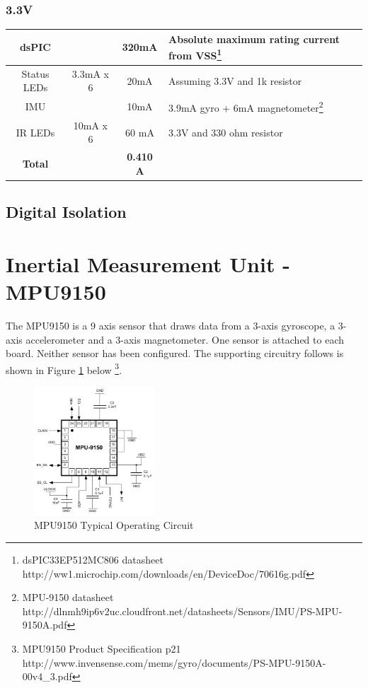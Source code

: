 \documentclass{article}
\begin{document}
\subsubsection*{3.3V}
\begin{longtable}{|c | c | c |  >{\centering\arraybackslash}p{} |} \hline
dsPIC && 320mA & Absolute maximum rating current from VSS\footnote{dsPIC33EP512MC806 datasheet http://ww1.microchip.com/downloads/en/DeviceDoc/70616g.pdf}\\ \hline
Status LEDs & 3.3mA x 6& 20mA & Assuming 3.3V and 1k resistor\\ \hline
IMU && 10mA & 3.9mA gyro + 6mA magnetometer\footnote{MPU-9150 datasheet http://dlnmh9ip6v2uc.cloudfront.net/datasheets/Sensors/IMU/PS-MPU-9150A.pdf} \\ \hline
IR LEDs &10mA x 6 & 60 mA & 3.3V  and 330 ohm resistor\\ \hline
\textbf{Total} && \textbf{0.410 A} &\\ \hline
\end{longtable}
\subsection{Digital Isolation}

\section{Inertial Measurement Unit - MPU9150}
The MPU9150 is a 9 axis sensor that draws data from a 3-axis gyroscope, a 3-axis accelerometer and a 3-axis magnetometer. One sensor is attached to each board. Neither sensor has been configured. The supporting circuitry follows is shown in Figure \ref{mpu9150} below \footnote{MPU9150 
Product Specification p21 http://www.invensense.com/mems/gyro/documents/PS-MPU-9150A-00v4\_3.pdf}.

\begin{figure}[h!]
	\centering
	\includegraphics[width=0.4\textwidth]{mpu9150}
	\caption{MPU9150 Typical Operating Circuit}
	\label{mpu9150}
\end{figure}
\end{document}
